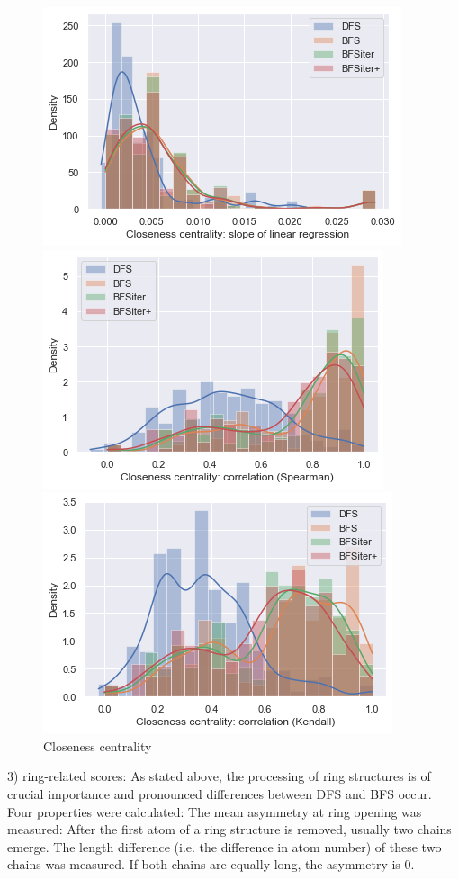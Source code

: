 \begin{figure}[H]
	
	\includegraphics{closeness_slope_all}
	
	\includegraphics{closeness_spearman}
	
	\includegraphics{closeness_kendall}\caption{Closeness centrality}
	
\end{figure}


3) ring-related scores: As stated above, the processing of ring structures
is of crucial importance and pronounced differences between DFS and
BFS occur. Four properties were calculated: The mean asymmetry at
ring opening was measured: After the first atom of a ring structure
is removed, usually two chains emerge. The length difference (i.e.
the difference in atom number) of these two chains was measured. If
both chains are equally long, the asymmetry is 0. 

